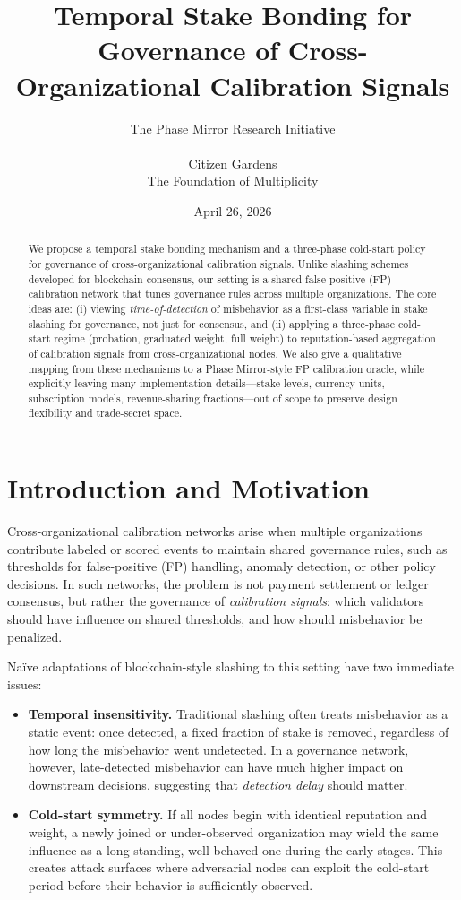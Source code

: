 \documentclass[11pt]{article}
\title{Temporal Stake Bonding for Governance of Cross-Organizational Calibration Signals}
\author{The Phase Mirror Research Initiative \\ \\ Citizen Gardens \\ The Foundation of Multiplicity}
\date{April 26, 2026}
\begin{document}
\maketitle

\begin{abstract}
We propose a temporal stake bonding mechanism and a three-phase cold-start policy for governance of cross-organizational calibration signals.
Unlike slashing schemes developed for blockchain consensus, our setting is a shared false-positive (FP) calibration network that tunes governance rules across multiple organizations.
The core ideas are:
(i) viewing \emph{time-of-detection} of misbehavior as a first-class variable in stake slashing for governance, not just for consensus, and
(ii) applying a three-phase cold-start regime (probation, graduated weight, full weight) to reputation-based aggregation of calibration signals from cross-organizational nodes.
We also give a qualitative mapping from these mechanisms to a Phase Mirror-style FP calibration oracle, while explicitly leaving many implementation details---stake levels, currency units, subscription models, revenue-sharing fractions---out of scope to preserve design flexibility and trade-secret space.
\end{abstract}

\newpage
\tableofcontents
\newpage
\section{Introduction and Motivation}

Cross-organizational calibration networks arise when multiple organizations contribute labeled or scored events to maintain shared governance rules, such as thresholds for false-positive (FP) handling, anomaly detection, or other policy decisions.
In such networks, the problem is not payment settlement or ledger consensus, but rather the governance of \emph{calibration signals}: which validators should have influence on shared thresholds, and how should misbehavior be penalized.

Na{\"i}ve adaptations of blockchain-style slashing to this setting have two immediate issues:
\begin{itemize}[leftmargin=*]
  \item \textbf{Temporal insensitivity.}
  Traditional slashing often treats misbehavior as a static event: once detected, a fixed fraction of stake is removed, regardless of how long the misbehavior went undetected.
  In a governance network, however, late-detected misbehavior can have much higher impact on downstream decisions, suggesting that \emph{detection delay} should matter.
  \item \textbf{Cold-start symmetry.}
  If all nodes begin with identical reputation and weight, a newly joined or under-observed organization may wield the same influence as a long-standing, well-behaved one during the early stages.
  This creates attack surfaces where adversarial nodes can exploit the cold-start period before their behavior is sufficiently observed.
\end{itemize}
\end{document}
